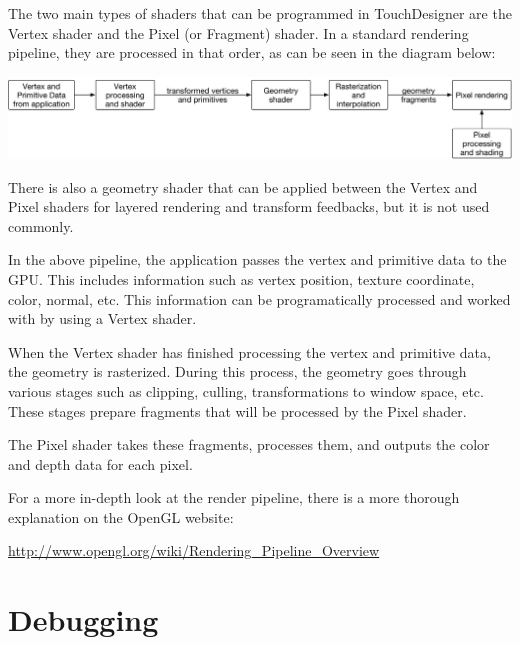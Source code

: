 \begin{fullwidth}
The two main types of shaders that can be programmed in TouchDesigner are the Vertex shader and the Pixel (or Fragment) shader. In a standard rendering pipeline, they are processed in that order, as can be seen in the diagram below:

\begin{center} 
\includegraphics{./img/12.2/pipeline.png}
\end{center}

There is also a geometry shader that can be applied between the Vertex and Pixel shaders for layered rendering and transform feedbacks, but it is not used commonly.

In the above pipeline, the application passes the vertex and primitive data to the GPU. This includes information such as vertex position, texture coordinate, color, normal, etc. This information can be programatically processed and worked with by using a Vertex shader.

When the Vertex shader has finished processing the vertex and primitive data, the geometry is rasterized. During this process, the geometry goes through various stages such as clipping, culling, transformations to window space, etc. These stages prepare fragments that will be processed by the Pixel shader. 

The Pixel shader takes these fragments, processes them, and outputs the color and depth data for each pixel.

For a more in-depth look at the render pipeline, there is a more thorough explanation on the OpenGL website:

\url{http://www.opengl.org/wiki/Rendering_Pipeline_Overview}
 
\end{fullwidth}


\section{Debugging}

